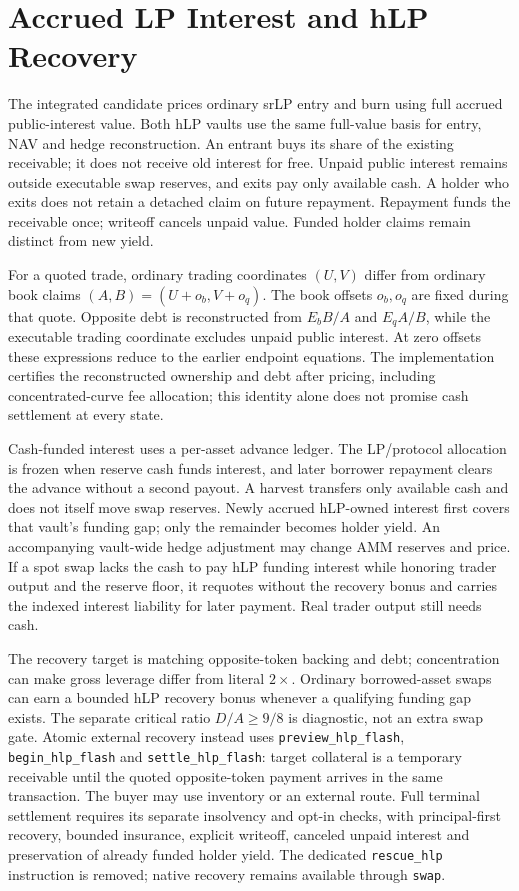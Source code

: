 \section{Accrued LP Interest and hLP Recovery}
\label{sec:hlp-accounting}

The integrated candidate prices ordinary srLP entry and burn using full accrued public-interest value. Both hLP vaults use the same full-value basis for entry, NAV and hedge reconstruction. An entrant buys its share of the existing receivable; it does not receive old interest for free. Unpaid public interest remains outside executable swap reserves, and exits pay only available cash. A holder who exits does not retain a detached claim on future repayment. Repayment funds the receivable once; writeoff cancels unpaid value. Funded holder claims remain distinct from new yield.

For a quoted trade, ordinary trading coordinates $(U,V)$ differ from ordinary book claims $(A,B)=(U+o_b,V+o_q)$. The book offsets $o_b,o_q$ are fixed during that quote. Opposite debt is reconstructed from $E_bB/A$ and $E_qA/B$, while the executable trading coordinate excludes unpaid public interest. At zero offsets these expressions reduce to the earlier endpoint equations. The implementation certifies the reconstructed ownership and debt after pricing, including concentrated-curve fee allocation; this identity alone does not promise cash settlement at every state.

Cash-funded interest uses a per-asset advance ledger. The LP/protocol allocation is frozen when reserve cash funds interest, and later borrower repayment clears the advance without a second payout. A harvest transfers only available cash and does not itself move swap reserves. Newly accrued hLP-owned interest first covers that vault's funding gap; only the remainder becomes holder yield. An accompanying vault-wide hedge adjustment may change AMM reserves and price. If a spot swap lacks the cash to pay hLP funding interest while honoring trader output and the reserve floor, it requotes without the recovery bonus and carries the indexed interest liability for later payment. Real trader output still needs cash.

The recovery target is matching opposite-token backing and debt; concentration can make gross leverage differ from literal $2\times$. Ordinary borrowed-asset swaps can earn a bounded hLP recovery bonus whenever a qualifying funding gap exists. The separate critical ratio $D/A\ge9/8$ is diagnostic, not an extra swap gate. Atomic external recovery instead uses \texttt{preview\_hlp\_flash}, \texttt{begin\_hlp\_flash} and \texttt{settle\_hlp\_flash}: target collateral is a temporary receivable until the quoted opposite-token payment arrives in the same transaction. The buyer may use inventory or an external route. Full terminal settlement requires its separate insolvency and opt-in checks, with principal-first recovery, bounded insurance, explicit writeoff, canceled unpaid interest and preservation of already funded holder yield. The dedicated \texttt{rescue\_hlp} instruction is removed; native recovery remains available through \texttt{swap}.

